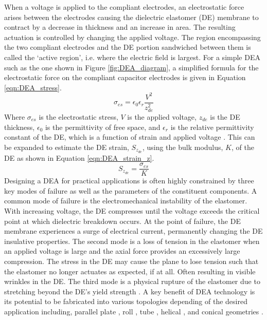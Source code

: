 When a voltage is applied to the compliant electrodes, an electrostatic force arises between the electrodes causing the dielectric elastomer (DE) membrane to contract by a decrease in thickness and an increase in area. The resulting actuation is controlled by changing the applied voltage. The region encompassing the two compliant electrodes and the DE portion sandwiched between them is called the `active region', i.e. where the electric field is largest. For a simple DEA such as the one shown in Figure \ref{fig:DEA_diagram}, a simplified formula for the electrostatic force on the compliant capacitor electrodes is given in Equation \ref{eqn:DEA_stress}.
\begin{equation}
	\sigma_{es} = \epsilon_0 \epsilon_r \frac{V^2}{z_{de}^2}
	\label{eqn:DEA_stress}
\end{equation}
Where $\sigma_{es}$ is the electrostatic stress, $V$ is the applied voltage, $z_{de}$ is the DE thickness, $\epsilon_0$ is the permittivity of free space, and $\epsilon_r$ is the relative permittivity constant of the DE, which is a function of strain \cite{Kofod2003, Choi2005, Wissler2007} and applied voltage \cite{Rosset2013}. This can be expanded to estimate the DE strain, $S_{z_{de}}$, using the bulk modulus, $K$, of the DE as shown in Equation \ref{eqn:DEA_strain_z}.
\begin{equation}
	S_{z_{de}} = \frac{\sigma_{es}}{K}
	\label{eqn:DEA_strain_z}
\end{equation}
Designing a DEA for practical applications is often highly constrained by three key modes of failure as well as the parameters of the constituent components. A common mode of failure is the electromechanical instability of the elastomer. With increasing voltage, the DE compresses until the voltage exceeds the critical point at which dielectric breakdown occurs. At the point of failure, the DE membrane experiences a surge of electrical current, permanently changing the DE insulative properties. The second mode is a loss of tension in the elastomer when an applied voltage is large and the axial force provides an excessively large compression. The stress in the DE may cause the plane to lose tension such that the elastomer no longer actuates as expected, if at all. Often resulting in visible wrinkles in the DE. The third mode is a physical rupture of the elastomer due to stretching beyond the DE's yield strength \cite{Mao2018}. A key benefit of DEA technology is its potential to be fabricated into various topologies depending of the desired application including, parallel plate \cite{Keplinger2012}, roll \cite{Zhao2018}, tube \cite{Thummala2012}, helical \cite{Kim2018}, and conical geometries \cite{Cao2018}.

